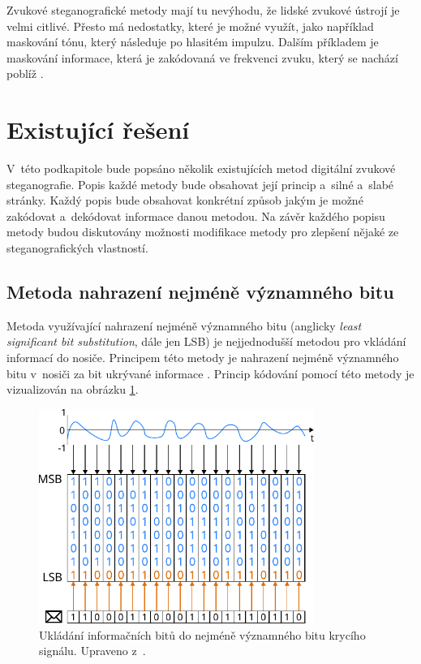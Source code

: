 Zvukové steganografické metody mají tu nevýhodu, že lidské zvukové ústrojí je
velmi citlivé. Přesto má nedostatky, které je možné využít, jako například
maskování tónu, který následuje po hlasitém impulzu. Dalším příkladem je
maskování informace, která je zakódovaná ve frekvenci zvuku, který se nachází
poblíž \cite{Dutta2020}.

\section{Existující řešení}
\label{sec:existing-methods}

V~této podkapitole bude popsáno několik existujících metod digitální zvukové
steganografie. Popis každé metody bude obsahovat její princip a~silné a~slabé
stránky. Každý popis bude obsahovat konkrétní způsob jakým je možné zakódovat
a~dekódovat informace danou metodou. Na závěr každého popisu metody budou
diskutovány možnosti modifikace metody pro zlepšení nějaké ze steganografických
vlastností.

\subsection*{Metoda nahrazení nejméně významného bitu}
\label{sub:lsb}

Metoda využívající nahrazení nejméně významného bitu (anglicky \textit{least
significant bit substitution}, dále jen LSB) je nejjednodušší metodou pro
vkládání informací do nosiče. Principem této metody je nahrazení nejméně
významného bitu v~nosiči za bit ukrývané informace \cite{Dutta2020}. Princip
kódování pomocí této metody je vizualizován na obrázku \ref{pic:lsb-diagram}.

\begin{figure}[hbt]
    \centering
    \includegraphics[width=0.8\textwidth]{obrazky/lsb-diagram.pdf}
    \caption{Ukládání informačních bitů do nejméně významného bitu krycího
    signálu. Upraveno z~\cite{Djebbar2012}.}
    \label{pic:lsb-diagram}
\end{figure}

